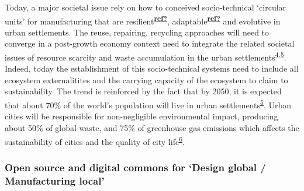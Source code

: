\documentclass[
  11pt,
  a4paperpaper,
  onecolumn]{article}
\begin{document}
Today, a major societal issue rely on how to conceived socio-technical
`circular units' for manufacturing that are
resilient\textsuperscript{\protect\hyperlink{ref-ref}{\textbf{ref?}}},
adaptable\textsuperscript{\protect\hyperlink{ref-ref}{\textbf{ref?}}}
and evolutive in urban settlements. The reuse, repairing, recycling
approaches will need to converge in a post-growth economy context need
to integrate the related societal issues of resource scarcity and waste
accumulation in the urban
settlements\textsuperscript{\protect\hyperlink{ref-kallis2018}{4},\protect\hyperlink{ref-savini2021}{5}}.
Indeed, today the establishment of this socio-technical systems need to
include all ecosystem externalitites and the carrying capacity of the
ecosystem to claim to sustainability. The trend is reinforced by the
fact that by 2050, it is expected that about 70\% of the world's
population will live in urban
settlements\textsuperscript{\protect\hyperlink{ref-savini2021}{5}}.
Urban cities will be responsible for non-negligible environmental
impact, producing about 50\% of global waste, and 75\% of greenhouse gas
emissions which affects the sustainability of cities and the quality of
city life\textsuperscript{\protect\hyperlink{ref-Riffat2016}{6}}.

\hypertarget{open-source-and-digital-commons-for-design-global-manufacturing-local}{%
\subsubsection{Open source and digital commons for `Design global /
Manufacturing
local'}\label{open-source-and-digital-commons-for-design-global-manufacturing-local}}
\end{document}
